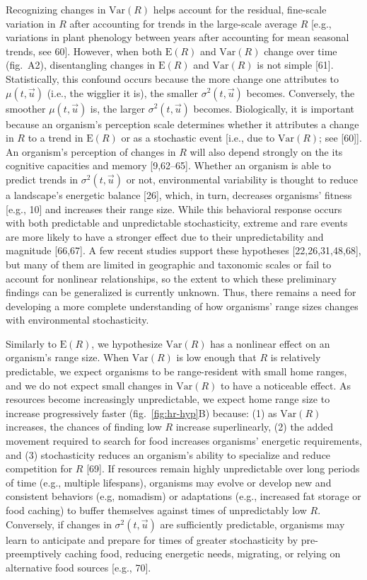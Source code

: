 \documentclass[
  12pt,
]{article}
\begin{document}
Recognizing changes in \(\text{Var}(R)\) helps account for the residual, fine-scale variation in \(R\) after accounting for trends in the large-scale average \(R\) {[}e.g., variations in plant phenology between years after accounting for mean seasonal trends, see 60{]}. However, when both \(\text{E}(R)\) and \(\text{Var}(R)\) change over time (fig.~A2), disentangling changes in \(\text{E}(R)\) and \(\text{Var}(R)\) is not simple {[}61{]}. Statistically, this confound occurs because the more change one attributes to \(\mu(t, \vec u)\) (i.e., the wigglier it is), the smaller \(\sigma^2(t, \vec u)\) becomes. Conversely, the smoother \(\mu(t, \vec u)\) is, the larger \(\sigma^2(t, \vec u)\) becomes. Biologically, it is important because an organism's perception scale determines whether it attributes a change in \(R\) to a trend in \(\text{E}(R)\) or as a stochastic event {[}i.e., due to \(\text{Var}(R)\); see {[}60{]}{]}. An organism's perception of changes in \(R\) will also depend strongly on the its cognitive capacities and memory {[}9,62--65{]}. Whether an organism is able to predict trends in \(\sigma^2(t, \vec u)\) or not, environmental variability is thought to reduce a landscape's energetic balance {[}26{]}, which, in turn, decreases organisms' fitness {[}e.g., 10{]} and increases their range size. While this behavioral response occurs with both predictable and unpredictable stochasticity, extreme and rare events are more likely to have a stronger effect due to their unpredictability and magnitude {[}66,67{]}. A few recent studies support these hypotheses {[}22,26,31,48,68{]}, but many of them are limited in geographic and taxonomic scales or fail to account for nonlinear relationships, so the extent to which these preliminary findings can be generalized is currently unknown. Thus, there remains a need for developing a more complete understanding of how organisms' range sizes changes with environmental stochasticity.

Similarly to \(\text{E}(R)\), we hypothesize \(\text{Var}(R)\) has a nonlinear effect on an organism's range size. When \(\text{Var}(R)\) is low enough that \(R\) is relatively predictable, we expect organisms to be range-resident with small home ranges, and we do not expect small changes in \(\text{Var}(R)\) to have a noticeable effect. As resources become increasingly unpredictable, we expect home range size to increase progressively faster (fig.~\ref{fig:hr-hyp}B) because: (1) as \(\text{Var}(R)\) increases, the chances of finding low \(R\) increase superlinearly, (2) the added movement required to search for food increases organisms' energetic requirements, and (3) stochasticity reduces an organism's ability to specialize and reduce competition for \(R\) {[}69{]}. If resources remain highly unpredictable over long periods of time (e.g., multiple lifespans), organisms may evolve or develop new and consistent behaviors (e.g, nomadism) or adaptations (e.g., increased fat storage or food caching) to buffer themselves against times of unpredictably low \(R\). Conversely, if changes in \(\sigma^2(t, \vec u)\) are sufficiently predictable, organisms may learn to anticipate and prepare for times of greater stochasticity by pre-preemptively caching food, reducing energetic needs, migrating, or relying on alternative food sources {[}e.g., 70{]}.
\end{document}
